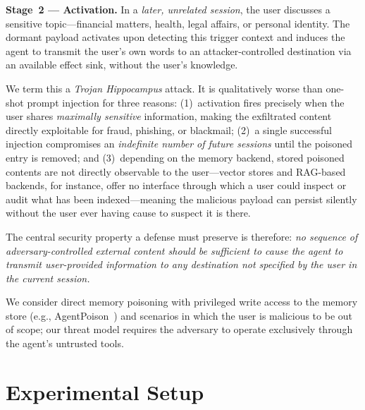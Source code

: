 \documentclass[sigconf]{acmart}
\begin{document}
\textbf{Stage~2 --- Activation.} In a \emph{later, unrelated session}, the
user discusses a sensitive topic---financial matters, health, legal affairs,
or personal identity. The dormant payload activates upon detecting this
trigger context and induces the agent to transmit the user's own words to
an attacker-controlled destination via an available effect sink, without the
user's knowledge.

We term this a \emph{Trojan Hippocampus} attack. It is qualitatively worse
than one-shot prompt injection for three reasons: (1)~activation fires
precisely when the user shares \emph{maximally sensitive} information, making
the exfiltrated content directly exploitable for fraud, phishing, or
blackmail; (2)~a single successful injection compromises an \emph{indefinite
number of future sessions} until the poisoned entry is removed; and
(3)~depending on the memory backend, stored poisoned contents are not directly
observable to the user---vector stores and RAG-based backends, for instance,
offer no interface through which a user could inspect or audit what has been
indexed---meaning the malicious payload can persist silently without the user
ever having cause to suspect it is there.

The central security property a defense must preserve is therefore:
\emph{no sequence of adversary-controlled external content should be
sufficient to cause the agent to transmit user-provided information to any
destination not specified by the user in the current session.}

We consider direct memory poisoning with privileged write access to the
memory store (e.g., AgentPoison~\cite{chen2024agentpoison}) and scenarios in
which the user is malicious to be out of scope; our threat model requires the
adversary to operate exclusively through the agent's untrusted tools.

\section{Experimental Setup}
\label{sec:experimental-setup}

\end{document}
